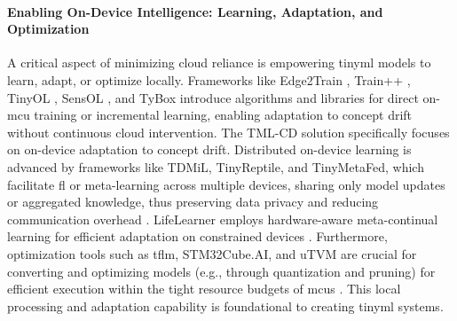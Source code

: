 \paragraph{Enabling On-Device Intelligence: Learning, Adaptation, and Optimization}
A critical aspect of minimizing cloud reliance is empowering \gls{tinyml} models to learn, adapt, or optimize locally. Frameworks like Edge2Train \cite{sudharsanEdge2TrainFrameworkTrain2020}, Train++ \cite{sudharsanTrainIncrementalML2021}, TinyOL \cite{renOndeviceOnlineLearning2024}, SensOL \cite{demaghSensOLMemoryEfficientOnline2024}, and TyBox \cite{pavanTyBoxAutomaticDesign2024} introduce algorithms and libraries for direct on-\gls{mcu} training or incremental learning, enabling adaptation to concept drift without continuous cloud intervention. The TML-CD \cite{disabatoTinyMachineLearning2024} solution specifically focuses on on-device adaptation to concept drift. Distributed on-device learning is advanced by frameworks like TDMiL, TinyReptile, and TinyMetaFed, which facilitate \gls{fl} or meta-learning across multiple devices, sharing only model updates or aggregated knowledge, thus preserving data privacy and reducing communication overhead \cite{gulatiTDMiLTinyDistributed2024}. LifeLearner employs hardware-aware meta-continual learning for efficient adaptation on constrained devices \cite{kwonLifeLearnerHardwareAwareMeta2023}. Furthermore, optimization tools such as \gls{tflm}, STM32Cube.AI, and uTVM are crucial for converting and optimizing models (e.g., through quantization and pruning) for efficient execution within the tight resource budgets of \glspl{mcu} \cite{davidTensorFlowLiteMicro2021}. This local processing and adaptation capability is foundational to creating \gls{tinyml} systems.


